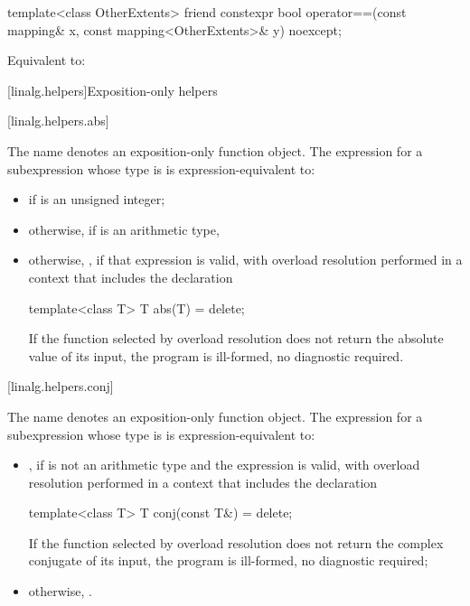 %
\begin{itemdecl}
template<class OtherExtents>
  friend constexpr bool operator==(const mapping& x, const mapping<OtherExtents>& y) noexcept;
\end{itemdecl}

\begin{itemdescr}
\pnum
\effects
Equivalent to: 
\end{itemdescr}

[linalg.helpers]{Exposition-only helpers}

[linalg.helpers.abs]{}

\pnum
The name  denotes an exposition-only function object.
The expression  for a subexpression 
whose type is  is expression-equivalent to:
\begin{itemize}
\item
{} if  is an unsigned integer;
\item
otherwise,  if  is an arithmetic type,
\item
otherwise, ,
if that expression is valid,
with overload resolution performed in a context that includes the declaration
\begin{codeblock}
template<class T> T abs(T) = delete;
\end{codeblock}
If the function selected by overload resolution
does not return the absolute value of its input,
the program is ill-formed, no diagnostic required.
\end{itemize}

[linalg.helpers.conj]{}

\pnum
The name  denotes an exposition-only function object.
The expression  for a subexpression 
whose type is  is expression-equivalent to:
\begin{itemize}
\item
{},
if  is not an arithmetic type and
the expression  is valid,
with overload resolution performed in a context that includes the declaration
\begin{codeblock}
template<class T> T conj(const T&) = delete;
\end{codeblock}
If the function selected by overload resolution
does not return the complex conjugate of its input,
the program is ill-formed, no diagnostic required;
\item
otherwise, .
\end{itemize}

